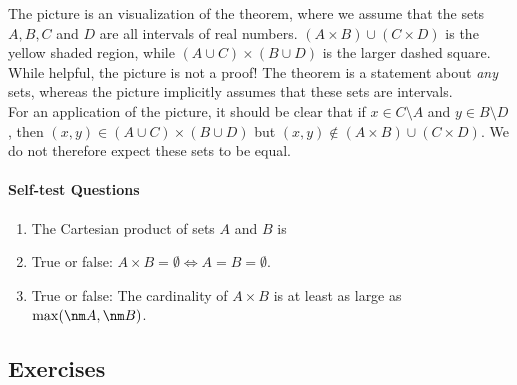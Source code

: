 \noindent The picture is an visualization of the theorem, where we assume that the sets $A,B,C$ and $D$ are all intervals of real numbers. $(A\times B)\cup(C\times D)$ is the yellow shaded region, while $(A\cup C)\times(B\cup D)$ is the larger dashed square. While helpful, the picture is not a proof! The theorem is a statement about \emph{any} sets, whereas the picture implicitly assumes that these sets are intervals.\\
For an application of the picture, it should be clear that if $x\in C\setminus A$ and $y\in B\setminus D$, then $(x,y)\in (A\cup C)\times (B\cup D)$ but $(x,y)\not\in (A\times B)\cup(C\times D)$. We do not therefore expect these sets to be equal.

\paragraph{Self-test Questions}

	\begin{enumerate}
    \item The Cartesian product of sets $A$ and $B$ is \underline{}
    \item True or false: $A\times B=\emptyset\iff A=B=\emptyset$.
    \item True or false: The cardinality of $A\times B$ is at least as large as $\max(\nm A,\nm B)$.
  \end{enumerate}

\subsection*{Exercises}

